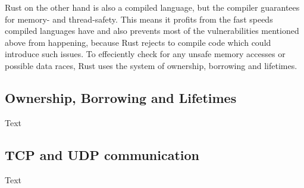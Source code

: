 Rust on the other hand is also a compiled language, but the compiler guarantees for memory- and thread-safety. This
means it profits from the fast speeds compiled languages have and also prevents most of the vulnerabilities mentioned
above from happening, because Rust rejects to compile code which could introduce such issues. To effeciently check for
any unsafe memory accesses or possible data races, Rust uses the system of ownership, borrowing and lifetimes.

\subsection{Ownership, Borrowing and Lifetimes}
Text

\subsection{TCP and UDP communication}
Text
